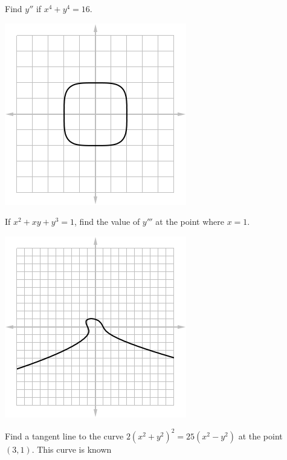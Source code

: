 \begin{questions}
\begin{multicols}{2}
\begin{center}
            \end{center}
  \end{multicols}
  \begin{multicols}{2}
  \questioM Find $ y'' $ if $ x^4 + y^4 = 16$.
            \begin{center}
              \includegraphics[width=0.6\linewidth]{implicit15}
            \end{center}
  \end{multicols}
  \begin{multicols}{2}
  \questioM If $ x^2 + xy + y^3 = 1 $, find the value of $ y''' $ at the point where $ x = 1 $.
            \begin{center}
              \includegraphics[width=0.6\linewidth]{implicit14}
            \end{center}
  \end{multicols}
  \begin{multicols}{2}
  \questioM Find a tangent line to the curve $ 2(x^2 + y^2)^2 = 25(x^2 - y^2) $ at the point $ (3, 1) $. This curve is known

\end{multicols}
\end{questions}
